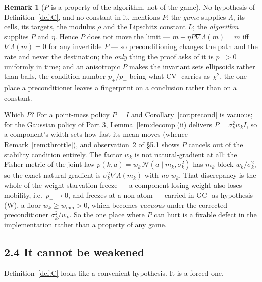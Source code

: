\documentclass[11pt]{article}
\theoremstyle{definition}
\newtheorem{remark}[theorem]{Remark}
\newcommand{\cN}{\mathcal{N}}
\newcommand{\GC}[1]{\textsf{GC-#1}}
\newcommand{\CV}[1]{\textsf{CV-#1}}
\begin{document}
\begin{remark}[$P$ is a property of the algorithm, not of the game]
\label{rem:Palg}
No hypothesis of Definition~\ref{def:C}, and no constant in it, mentions $P$: the
\emph{game} supplies $\Lambda$, its cells, its targets, the modulus $\rho$ and
the Lipschitz constant $L$; the \emph{algorithm} supplies $P$ and $\eta$. Hence
$P$ does not move the limit --- $m + \eta P\nabla\Lambda(m) = m$ iff
$\nabla\Lambda(m) = 0$ for any invertible $P$ --- so preconditioning changes the
path and the rate and never the destination; the \emph{only} thing the proof asks
of it is $p_- > 0$ uniformly in time; and an anisotropic $P$ makes the invariant
sets ellipsoids rather than balls, the condition number $p_+/p_-$ being what
\CV{} carries as $\chi^2$, the one place a preconditioner leaves a fingerprint on
a conclusion rather than on a constant.

Which $P$? For a point-mass policy $P = I$ and Corollary~\ref{cor:precond} is
vacuous; for the Gaussian policy of Part 3, Lemma~\ref{lem:decomp}(ii) delivers
$P = \sigma_k^2 w_k I$, so a component's width sets how fast its mean moves
(whence Remark~\ref{rem:throttle}), and observation~2 of \S5.1 shows $P$ cancels
out of the stability condition entirely. The factor $w_k$ is not
natural-gradient at all: the Fisher metric of the joint law
$p(k,a) = w_k\,\cN(a \mid m_k,\sigma_k^2)$ has $m_k$-block $w_k/\sigma_k^2$, so
the exact natural gradient is $\sigma_k^2\nabla\Lambda(m_k)$ with \emph{no}
$w_k$. That discrepancy is the whole of the weight-starvation freeze --- a
component losing weight also loses mobility, i.e.\ $p_- \to 0$, and freezes at a
non-atom --- carried in \GC{} as hypothesis (W), a floor $w_k \ge w_{\min} > 0$,
which becomes \emph{vacuous} under the corrected preconditioner $\sigma_k^2/w_k$.
So the one place where $P$ can hurt is a fixable defect in the implementation
rather than a property of any game.
\end{remark}

\subsection*{2.4 It cannot be weakened}

Definition~\ref{def:C} looks like a convenient hypothesis. It is a forced one.
\end{document}
